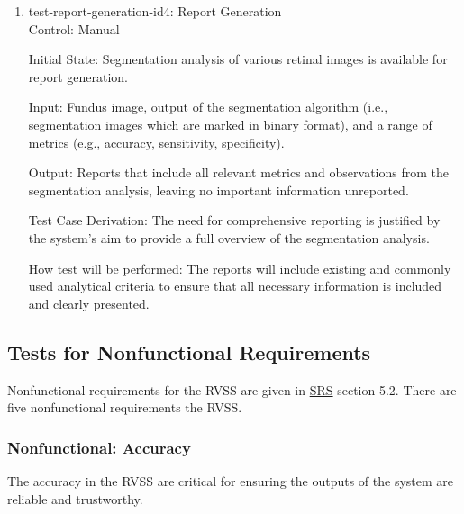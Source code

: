 \documentclass[12pt, titlepage]{article}
\begin{document}
\begin{enumerate}

\item{test-report-generation-id4: Report Generation\\}
\label{test-id-4}
Control: Manual 
					
Initial State: Segmentation analysis of various retinal images is available for report generation.
					
Input:  Fundus image, output of the segmentation algorithm (i.e., segmentation images which are marked in binary format), and a range of metrics (e.g., accuracy, sensitivity, specificity).
					
Output: Reports that include all relevant metrics and observations from the segmentation analysis, leaving no important information unreported.

Test Case Derivation: The need for comprehensive reporting is justified by the system’s aim to provide a full overview of the segmentation analysis.
					
How test will be performed: The reports will include existing and commonly used analytical criteria to ensure that all necessary information is included and clearly presented.
\end{enumerate}


\subsection{Tests for Nonfunctional Requirements}

Nonfunctional requirements for the RVSS are given in \href{https://github.com/lele0007/Blood-vessel-segmentation/blob/main/docs/SRS/SRS.pdf}{SRS} section 5.2. There are five nonfunctional requirements the RVSS. 



\subsubsection{Nonfunctional: Accuracy}
\label{non_functional_accuracy}		
The accuracy in the RVSS are critical for ensuring the outputs of the system are reliable and trustworthy. 
\end{document}
